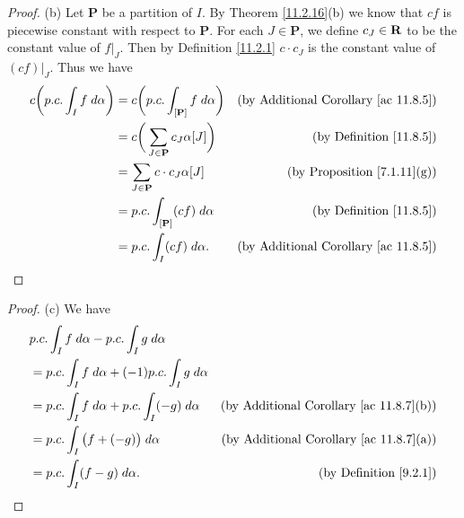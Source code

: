 \begin{proof}{(b)}
    Let \(\mathbf{P}\) be a partition of \(I\).
    By Theorem \ref{11.2.16}(b) we know that \(cf\) is piecewise constant with respect to \(\mathbf{P}\).
    For each \(J \in \mathbf{P}\), we define \(c_J \in \mathbf{R}\) to be the constant value of \(f|_J\).
    Then by Definition \ref{11.2.1} \(c \cdot c_J\) is the constant value of \((cf)|_J\).
    Thus we have
    \begin{align*}
        c \bigg(p.c. \int_I f \; d \alpha\bigg) & = c \bigg(p.c. \int_{[\mathbf{P}]} f \; d \alpha\bigg) & \text{(by Additional Corollary \ref{ac 11.8.5})} \\
                                                & = c \bigg(\sum_{J \in \mathbf{P}} c_J \alpha[J]\bigg)  & \text{(by Definition \ref{11.8.5})}              \\
                                                & = \sum_{J \in \mathbf{P}} c \cdot c_J \alpha[J]        & \text{(by Proposition \ref{7.1.11}(g))}          \\
                                                & = p.c. \int_{[\mathbf{P}]} (c f) \; d \alpha           & \text{(by Definition \ref{11.8.5})}              \\
                                                & = p.c. \int_I (c f) \; d \alpha.                       & \text{(by Additional Corollary \ref{ac 11.8.5})}
    \end{align*}
\end{proof}

\begin{proof}{(c)}
    We have
    \begin{align*}
         & p.c. \int_I f \; d \alpha - p.c. \int_I g \; d \alpha                                                              \\
         & = p.c. \int_I f \; d \alpha + (-1) p.c. \int_I g \; d \alpha                                                       \\
         & = p.c. \int_I f \; d \alpha + p.c. \int_I (-g) \; d \alpha   & \text{(by Additional Corollary \ref{ac 11.8.7}(b))} \\
         & = p.c. \int_I \big(f + (-g)\big) \; d \alpha                 & \text{(by Additional Corollary \ref{ac 11.8.7}(a))} \\
         & = p.c. \int_I (f - g) \; d \alpha.                           & \text{(by Definition \ref{9.2.1})}
    \end{align*}
\end{proof}

